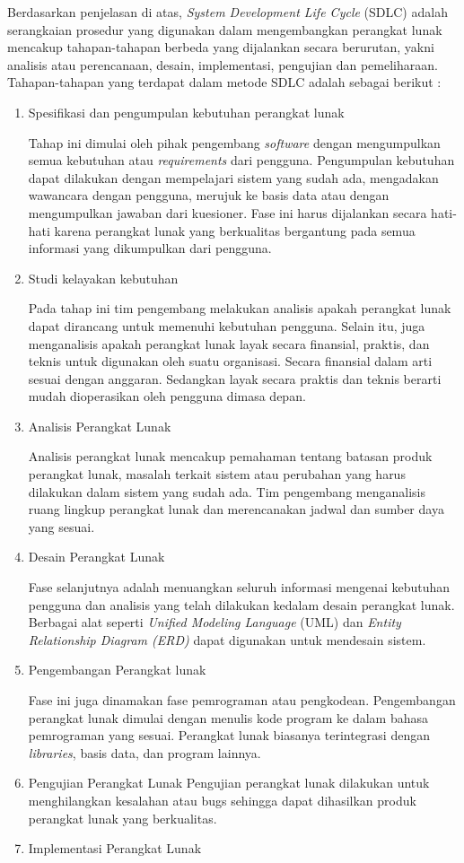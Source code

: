 Berdasarkan penjelasan di atas, \textit{System Development Life Cycle} (SDLC) adalah serangkaian prosedur yang digunakan dalam mengembangkan perangkat lunak mencakup tahapan-tahapan berbeda yang dijalankan secara berurutan, yakni analisis atau perencanaan, desain, implementasi, pengujian dan pemeliharaan. Tahapan-tahapan yang terdapat dalam metode SDLC adalah sebagai berikut \cite{Mohit} :
\begin{enumerate}
	\item Spesifikasi dan pengumpulan kebutuhan perangkat lunak
	
	Tahap ini dimulai oleh pihak pengembang \textit{software} dengan mengumpulkan semua kebutuhan atau \textit{requirements} dari pengguna. Pengumpulan kebutuhan dapat dilakukan dengan mempelajari sistem yang sudah ada, mengadakan wawancara dengan pengguna, merujuk ke basis data atau dengan mengumpulkan jawaban dari kuesioner. Fase ini harus dijalankan secara hati-hati karena perangkat lunak yang berkualitas bergantung pada semua informasi yang dikumpulkan dari pengguna. 
	\item Studi kelayakan kebutuhan
	
	Pada tahap ini tim pengembang melakukan analisis apakah perangkat lunak dapat dirancang untuk memenuhi kebutuhan pengguna. Selain itu, juga menganalisis apakah perangkat lunak layak secara finansial, praktis, dan teknis untuk digunakan oleh suatu organisasi. Secara finansial dalam arti sesuai dengan anggaran. Sedangkan layak secara praktis dan teknis berarti mudah dioperasikan oleh pengguna dimasa depan.
	\item Analisis Perangkat Lunak
	
	Analisis perangkat lunak mencakup pemahaman tentang batasan produk perangkat lunak, masalah terkait sistem atau perubahan yang harus dilakukan dalam sistem yang sudah ada. Tim pengembang menganalisis ruang lingkup perangkat lunak dan merencanakan jadwal dan sumber daya yang sesuai.
	\item Desain Perangkat Lunak
	
	Fase selanjutnya adalah menuangkan seluruh informasi mengenai kebutuhan pengguna dan analisis yang telah dilakukan kedalam desain perangkat lunak. Berbagai alat seperti\textit{ Unified Modeling Language} (UML) dan \textit{Entity Relationship Diagram (ERD)} dapat digunakan untuk mendesain sistem. 
	\item Pengembangan Perangkat lunak
	
	Fase ini juga dinamakan fase pemrograman atau pengkodean. Pengembangan perangkat lunak dimulai dengan menulis kode program ke dalam bahasa pemrograman yang sesuai. Perangkat lunak biasanya terintegrasi dengan \textit{libraries}, basis data, dan program lainnya. 
	\item Pengujian Perangkat Lunak
	Pengujian perangkat lunak dilakukan untuk menghilangkan kesalahan atau bugs sehingga dapat dihasilkan produk perangkat lunak yang berkualitas.
	\item Implementasi Perangkat Lunak
	

\end{enumerate}
